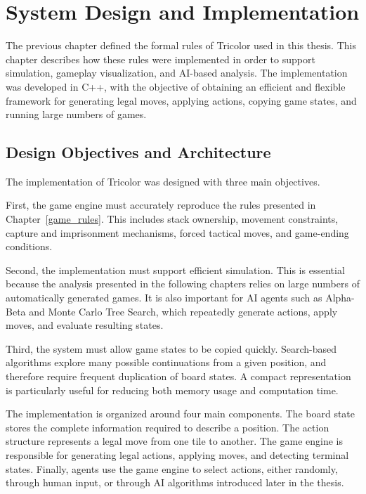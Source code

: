 \chapter{System Design and Implementation}
\label{implementation_of_the_game_model}

The previous chapter defined the formal rules of Tricolor used in this thesis. This chapter describes how these rules were implemented in order to support simulation, gameplay visualization, and AI-based analysis. The implementation was developed in C++, with the objective of obtaining an efficient and flexible framework for generating legal moves, applying actions, copying game states, and running large numbers of games.

\section{Design Objectives and Architecture}

The implementation of Tricolor was designed with three main objectives.

First, the game engine must accurately reproduce the rules presented in Chapter~\ref{game_rules}. This includes stack ownership, movement constraints, capture and imprisonment mechanisms, forced tactical moves, and game-ending conditions.

Second, the implementation must support efficient simulation. This is essential because the analysis presented in the following chapters relies on large numbers of automatically generated games. It is also important for AI agents such as Alpha-Beta and Monte Carlo Tree Search, which repeatedly generate actions, apply moves, and evaluate resulting states.

Third, the system must allow game states to be copied quickly. Search-based algorithms explore many possible continuations from a given position, and therefore require frequent duplication of board states. A compact representation is particularly useful for reducing both memory usage and computation time.

The implementation is organized around four main components. The board state stores the complete information required to describe a position. The action structure represents a legal move from one tile to another. The game engine is responsible for generating legal actions, applying moves, and detecting terminal states. Finally, agents use the game engine to select actions, either randomly, through human input, or through AI algorithms introduced later in the thesis.

